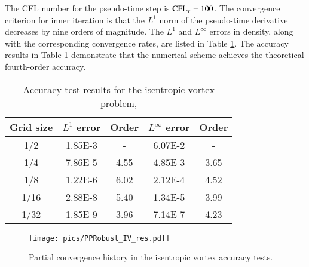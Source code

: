 The CFL number for the pseudo-time step is $\text{CFL}_\tau = 100$. 
The convergence criterion for inner iteration is that the $L^1$ norm of the pseudo-time derivative 
decreases by nine orders of magnitude.
The $L^1$ and $L^\infty$ errors in density, 
along with the corresponding convergence rates, 
are listed in Table \ref{tab:ivResults}. 
The accuracy results in Table \ref{tab:ivResults} demonstrate that the numerical scheme achieves the theoretical fourth-order accuracy.


\begin{table}[htbp!]
    \centering
    \caption{Accuracy test results for the isentropic vortex problem, }
    \label{tab:ivResults}
    \setlength{\tabcolsep}{12.5pt} %
    \renewcommand{\arraystretch}{1.2}
    \begin{tabular}{ c c c c c}
        \toprule
        Grid size & $L^1$ error & Order & $L^\infty$ error & Order \\
        \midrule
        1/2 &1.85E-3 & - & 6.07E-2 & -\\
        1/4 &7.86E-5 & 4.55 & 4.85E-3 & 3.65\\
        1/8 &1.22E-6 & 6.02 & 2.12E-4 & 4.52\\
        1/16 &2.88E-8 & 5.40 & 1.34E-5 & 3.99\\
        1/32 &1.85E-9 & 3.96 & 7.14E-7 & 4.23 \\
    \bottomrule
    \end{tabular}
\end{table}


\begin{figure}[htbp!]
    \centering
    \texttt{[image: pics/PPRobust\_IV\_res.pdf]}
    \caption{Partial convergence history in the isentropic vortex accuracy tests.}
    \label{fig:IVres}
\end{figure}


